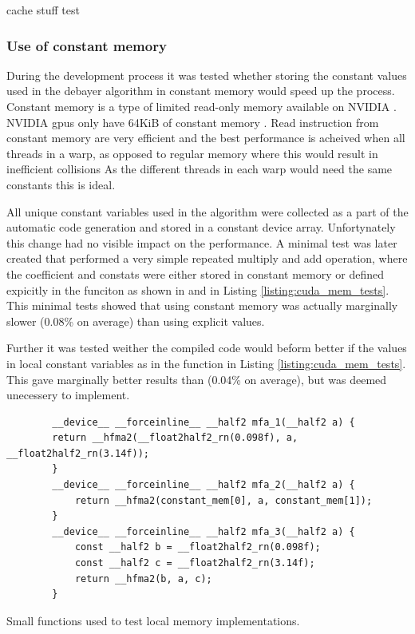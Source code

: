 \todo cache stuff test





\subsubsection{Use of constant memory}
During the development process it was tested whether storing the constant values used in the debayer algorithm in constant memory would speed up the process.
Constant memory is a type of limited read-only memory available on NVIDIA  \cite[61]{nvidiaCUDABestPractices2023}.
NVIDIA \glspl{gpu} only have 64KiB of constant memory \cite[61]{nvidiaCUDABestPractices2023}.
Read instruction from constant memory are very efficient and the best performance is acheived when all threads in a warp, as opposed to regular memory where this would result in inefficient collisions \cite[61]{nvidiaCUDABestPractices2023} \cite[13,14]{volkovLatencyHiding2016}
As the different threads in each warp would need the same constants this is ideal.

All unique constant variables used in the algorithm were collected as a part of the automatic code generation and stored in a constant device array.
Unfortynately this change had no visible impact on the performance.
A minimal test was later created that performed a very simple repeated multiply and add operation, where the coefficient and constats were either stored in constant memory or defined expicitly in the funciton as shown in  and  in Listing \ref{listing:cuda_mem_tests}.
This minimal tests showed that using constant memory was actually marginally slower (0.08\% on average) than using explicit values.

Further it was tested weither the compiled code would beform better if the values in local constant variables as in the  function in Listing \ref{listing:cuda_mem_tests}.
This gave marginally better results than  (0.04\% on average), but was deemed unecessery to implement.

\begin{listing}[H]
    \begin{verbatim}
        __device__ __forceinline__ __half2 mfa_1(__half2 a) {
        return __hfma2(__float2half2_rn(0.098f), a, __float2half2_rn(3.14f));
        }
        __device__ __forceinline__ __half2 mfa_2(__half2 a) {
            return __hfma2(constant_mem[0], a, constant_mem[1]);
        }
        __device__ __forceinline__ __half2 mfa_3(__half2 a) {
            const __half2 b = __float2half2_rn(0.098f);
            const __half2 c = __float2half2_rn(3.14f);
            return __hfma2(b, a, c);
        }
    \end{verbatim}
    \caption{Small functions used to test local memory implementations.}
    \label{listing:cuda_mem_tests}
\end{listing}



